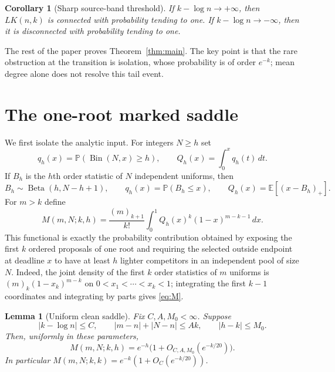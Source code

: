 \documentclass[11pt]{article}
\newtheorem{lemma}[theorem]{Lemma}
\newtheorem{corollary}[theorem]{Corollary}
\newcommand{\Pp}{\mathbb P}
\newcommand{\Ee}{\mathbb E}
\newcommand{\1}{\mathbf 1}
\newcommand{\Bin}{\operatorname{Bin}}
\newcommand{\Beta}{\operatorname{Beta}}
\newcommand{\LK}{LK}
\newcommand{\fall}[2]{(#1)_{#2}}
\begin{document}
\begin{corollary}[Sharp source-band threshold]\label{cor:band}
If $k-\log n\to+\infty$, then $\LK(n,k)$ is connected with probability tending to one.
If $k-\log n\to-\infty$, then it is disconnected with probability tending to one.
\end{corollary}

The rest of the paper proves Theorem~\ref{thm:main}.  The key point is that the
rare obstruction at the transition is isolation, whose probability is of order $e^{-k}$;
mean degree alone does not resolve this tail event.

\section{The one-root marked saddle}

We first isolate the analytic input.  For integers $N\ge h$ set
\[
 q_h(x)=\Pp(\Bin(N,x)\ge h),\qquad
 Q_h(x)=\int_0^x q_h(t)\,dt.
\]
If $B_h$ is the $h$th order statistic of $N$ independent uniforms, then
\[
 B_h\sim\Beta(h,N-h+1),\qquad
 q_h(x)=\Pp(B_h\le x),\qquad
 Q_h(x)=\Ee[(x-B_h)_+].
\]
For $m>k$ define
\begin{equation}\label{eq:M}
 M(m,N;k,h)=\frac{\fall m{k+1}}{k!}
 \int_0^1 Q_h(x)^k(1-x)^{m-k-1}\,dx .
\end{equation}
This functional is exactly the probability contribution obtained by exposing the first
$k$ ordered proposals of one root and requiring the selected outside endpoint at deadline
$x$ to have at least $h$ lighter competitors in an independent pool of size $N$.
Indeed, the joint density of the first $k$ order statistics of $m$ uniforms is
$\fall m k(1-x_k)^{m-k}$ on $0<x_1<\cdots<x_k<1$; integrating the first $k-1$
coordinates and integrating by parts gives \eqref{eq:M}.

\begin{lemma}[Uniform clean saddle]\label{lem:saddle}
Fix $C,A,M_0<\infty$.  Suppose
\[
 |k-\log n|\le C,\qquad |m-n|+|N-n|\le Ak,
 \qquad |h-k|\le M_0.
\]
Then, uniformly in these parameters,
\begin{equation}\label{eq:saddle}
 M(m,N;k,h)=e^{-h}\bigl(1+O_{C,A,M_0}(e^{-k/20})\bigr).
\end{equation}
In particular $M(m,N;k,k)=e^{-k}(1+O_C(e^{-k/20}))$.
\end{lemma}
\end{document}
